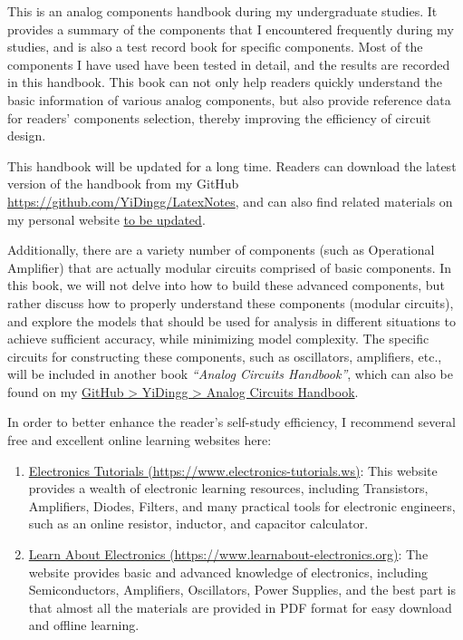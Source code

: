 \documentclass[UTF8]{report}
\begin{document}
\newpage
\begin{enabstract}
    This is an analog components handbook during my undergraduate studies. It provides a summary of the components that I encountered frequently during my studies, and is also a test record book for specific components. Most of the components I have used have been tested in detail, and the results are recorded in this handbook. This book can not only help readers quickly understand the basic information of various analog components, but also provide reference data for readers' components selection, thereby improving the efficiency of circuit design.

    This handbook will be updated for a long time. Readers can download the latest version of the handbook from my GitHub \href{https://github.com/YiDingg/LatexNotes}{https://github.com/YiDingg/LatexNotes}, and can also find related materials on my personal website \href{URL}{to be updated}.

    

    Additionally, there are a variety number of components (such as Operational Amplifier) that are actually modular circuits comprised of basic components. In this book, we will not delve into how to build these advanced components, but rather discuss how to properly understand these components (modular circuits), and explore the models that should be used for analysis in different situations to achieve sufficient accuracy, while minimizing model complexity. The specific circuits for constructing these components, such as oscillators, amplifiers, etc., will be included in another book \textit{``Analog Circuits Handbook''}, which can also be found on my \href{https://github.com/YiDingg/LatexNotes/tree/main/%5BNotes%5D%20Electornic%20Circuits%20Manual}{GitHub > YiDingg > Analog Circuits Handbook}. 
    
    In order to better enhance the reader's self-study efficiency, I recommend several free and excellent online learning websites here: 
    \begin{enumerate}
    \item \href{https://www.electronics-tutorials.ws}{Electronics Tutorials {\color{black} (https://www.electronics-tutorials.ws)}}: This website provides a wealth of electronic learning resources, including Transistors, Amplifiers, Diodes, Filters, and many practical tools for electronic engineers, such as an online resistor, inductor, and capacitor calculator.
    
    \item \href{https://www.learnabout-electronics.org}{  Learn About Electronics  {\color{black} (https://www.learnabout-electronics.org)}}: The website provides basic and advanced knowledge of electronics, including Semiconductors, Amplifiers, Oscillators, Power Supplies, and the best part is that almost all the materials are provided in PDF format for easy download and offline learning.
    

\end{enumerate}
\end{enabstract}
\end{document}
